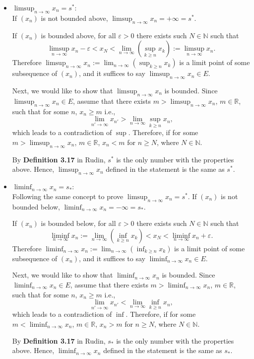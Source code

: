 \documentclass[a4paper]{article}
\newcommand{\R}{\mathbb{R}}
\newcommand{\N}{\mathbb{N}}
\newcommand{\ve}{\varepsilon}
\theoremstyle{plain}
\begin{document}
\begin{itemize}
    \item $\limsup_{n\to\infty}x_n = s^*$: \\
    If $(x_n)$ is not bounded above, $\limsup_{n\to\infty}x_n = +\infty = s^*$.
    
    If $(x_n)$ is bounded above, for all $\ve > 0$ there exists such $N \in \N$ such that
    \[
        \limsup_{n\to\infty} x_n - \ve < x_N < \lim_{n\to\infty}\left(\sup_{k\geq n}x_k\right)
        := \limsup_{n\to\infty}x_n.
    \]
    Therefore $\limsup_{n\to\infty}x_n := \lim_{n\to\infty}\left(\sup_{k\geq n}x_k\right)$
    is a limit point of some subsequence of $(x_n)$, and it suffices to say $\limsup_{n\to\infty}x_n \in E$.
    
    Next, we would like to show that $\limsup_{n\to\infty}x_n$ is bounded.
    Since $\limsup_{n\to\infty}x_n \in E$, assume that there exists $m > \limsup_{n\to\infty}x_n$, $m \in \R$, such that 
    for some $n$, $x_n \geq m$ i.e.,
    \[
        \lim_{n'\to\infty}x_{n'} > \lim_{n\to\infty}\sup_{k\geq n}x_n,
    \]
    which leads to a contradiction of $\sup$. Therefore, if for some $m > \limsup_{n\to\infty}x_n$, $m \in \R$,
    $x_n < m$ for $n \geq N$, where $N \in \N$.
    
    By {\bf Definition 3.17} in Rudin, $s^*$ is the only number with the properties above. Hence,
    $\limsup_{n\to\infty}x_n$ defined in the statement is the same as $s^*$.
    \item $\liminf_{n\to\infty}x_n = s_*$: \\
    Following the same concept to prove $\limsup_{n\to\infty}x_n = s^*$.
    If $(x_n)$ is not bounded below, $\liminf_{n\to\infty}x_n = -\infty = s_*$.
    
    If $(x_n)$ is bounded below, for all $\ve > 0$ there exists such $N \in \N$ such that
    \[
        \liminf_{n\to\infty} x_n := \lim_{n\to\infty}\left(\inf_{k\geq n}x_k\right) < x_N < \liminf_{n\to\infty}x_n + \ve.
    \]
    Therefore $\liminf_{n\to\infty}x_n := \lim_{n\to\infty}\left(\inf_{k\geq n}x_k\right)$
    is a limit point of some subsequence of $(x_n)$, and it suffices to say $\liminf_{n\to\infty}x_n \in E$.
    
    Next, we would like to show that $\liminf_{n\to\infty}x_n$ is bounded.
    Since $\liminf_{n\to\infty}x_n \in E$, assume that there exists $m > \liminf_{n\to\infty}x_n$, $m \in \R$, such that 
    for some $n$, $x_n \geq m$ i.e.,
    \[
        \lim_{n'\to\infty}x_{n'} < \lim_{n\to\infty}\inf_{k\geq n}x_n,
    \]
    which leads to a contradiction of $\inf$. Therefore, if for some $m < \liminf_{n\to\infty}x_n$, $m \in \R$,
    $x_n > m$ for $n \geq N$, where $N \in \N$.
    
    By {\bf Definition 3.17} in Rudin, $s_*$ is the only number with the properties above. Hence,
    $\liminf_{n\to\infty}x_n$ defined in the statement is the same as $s_*$.
\end{itemize}
\end{document}
